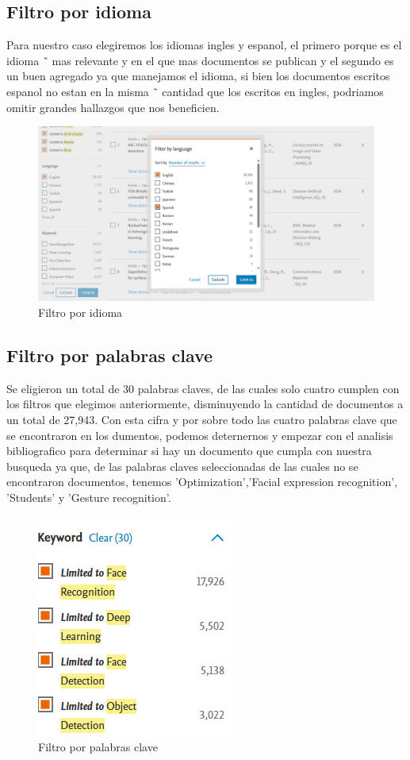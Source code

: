 \documentclass[conference]{IEEEtran}
\begin{document}
\subsection{Filtro por idioma}

Para nuestro caso elegiremos
los idiomas ingles y espanol, el primero porque es el idioma ˜
mas relevante y en el que mas documentos se publican y el
segundo es un buen agregado ya que manejamos el idioma,
si bien los documentos escritos espanol no estan en la misma ˜
cantidad que los escritos en ingles, podriamos omitir grandes
hallazgos que nos beneficien.
\begin{figure}[h]
    \centering
    \includegraphics[width=1\linewidth]{3.png}
    \caption{ Filtro por idioma}
    \label{fig:enter-label}
\end{figure}
\subsection{Filtro por palabras clave}

Se eligieron un total de
30 palabras claves, de las cuales solo cuatro cumplen con los
filtros que elegimos anteriormente, disminuyendo la cantidad
de documentos a un total de 27,943. Con esta cifra y por
sobre todo las cuatro palabras clave que se encontraron en
los dumentos, podemos deternernos y empezar con el analisis
bibliografico para determinar si hay un documento que cumpla
con nuestra busqueda ya que, de las palabras claves seleccionadas de las cuales no se encontraron documentos, tenemos
’Optimization’,’Facial expression recognition’, ’Students’ y
’Gesture recognition’.
\begin{figure}[H]
    \centering
    \includegraphics[width=0.5\linewidth]{4.png}
    \caption{Filtro por palabras clave}
    \label{fig:enter-label}
\end{figure}
\end{document}
